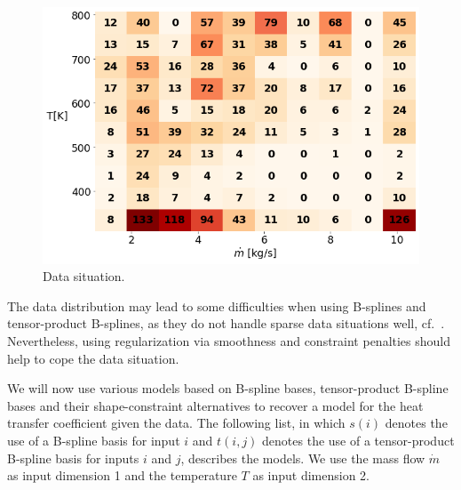 \begin{figure}[H]
	\centering
	\includegraphics[width=0.8\columnwidth]{graphics/pgfplots/cha5/Ebner/data_distribution.png}
	\caption{Data situation.}
	\label{fig:ebner_data_situation}
\end{figure}

The data distribution may lead to some difficulties when using B-splines and tensor-product B-splines, as they do not handle sparse data situations well, cf.~. Nevertheless, using regularization via smoothness and constraint penalties should help to cope the data situation. 

We will now use various models based on B-spline bases, tensor-product B-spline bases and their shape-constraint alternatives to recover a model for the heat transfer coefficient given the data. The following list, in which $s(i)$ denotes the use of a B-spline basis for input $i$ and $t(i,j)$ denotes the use of a tensor-product B-spline basis for inputs $i$ and $j$, describes the models. We use the mass flow $\dot{m}$ as input dimension 1 and the temperature $T$ as input dimension 2. 

